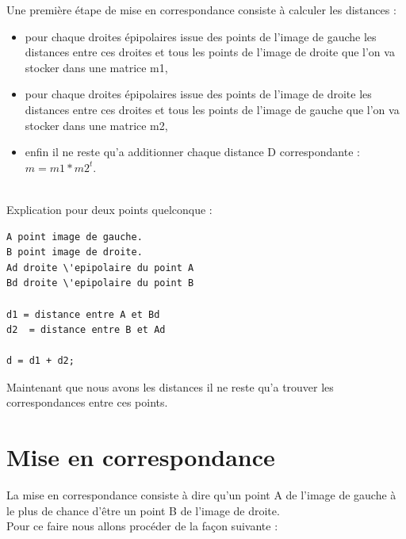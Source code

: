 \documentclass[a4paper,10pt]{article}
\begin{document}
Une premi\`ere \'etape de mise en correspondance consiste \`a calculer les distances :
 \begin{itemize}
 \item pour chaque droites \'epipolaires issue des points de l'image de gauche les distances entre ces droites et tous les points de l'image de droite que l'on va stocker dans une matrice m1, \\
\item pour chaque droites \'epipolaires issue des points de l'image de droite les distances entre ces droites et tous les points de l'image de gauche que l'on va stocker dans une matrice m2, \\
\item enfin il ne reste qu'a additionner chaque distance D correspondante : $m = m1*m2^t$.
 \end{itemize}
~\\

Explication pour deux points quelconque :

\begin{Verbatim}[commandchars=\\\{\}]
A point image de gauche.
B point image de droite.
Ad droite \'epipolaire du point A
Bd droite \'epipolaire du point B

d1 = distance entre A et Bd
d2  = distance entre B et Ad

d = d1 + d2;
\end{Verbatim}

Maintenant que nous avons les distances il ne reste qu'a trouver les correspondances entre ces points.

\section{Mise en correspondance}

La mise en correspondance consiste \`a dire qu'un point A de l'image de gauche \`a le plus de chance d'\^etre un point B de l'image de droite. \\

Pour ce faire nous allons proc\'eder de la fa\c con suivante :
\end{document}
